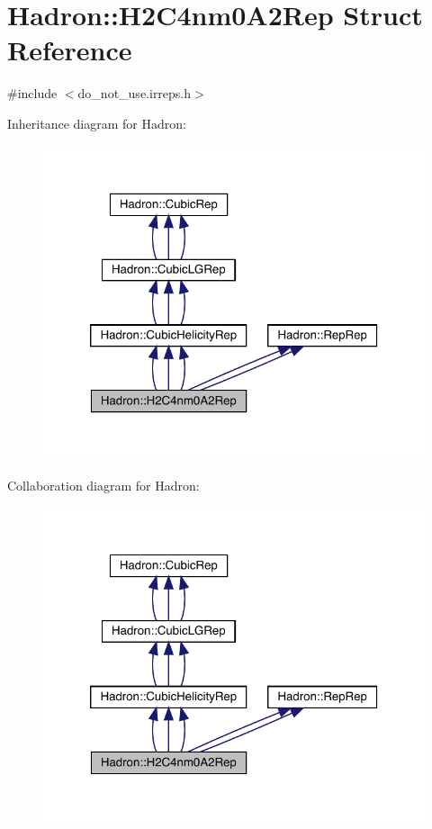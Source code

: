 \hypertarget{structHadron_1_1H2C4nm0A2Rep}{}\section{Hadron\+:\+:H2\+C4nm0\+A2\+Rep Struct Reference}
\label{structHadron_1_1H2C4nm0A2Rep}


{\ttfamily \#include $<$do\+\_\+not\+\_\+use.\+irreps.\+h$>$}



Inheritance diagram for Hadron\+:
\nopagebreak
\begin{figure}[H]
\begin{center}
\leavevmode
\includegraphics[width=320pt]{da/da3/structHadron_1_1H2C4nm0A2Rep__inherit__graph}
\end{center}
\end{figure}


Collaboration diagram for Hadron\+:
\nopagebreak
\begin{figure}[H]
\begin{center}
\leavevmode
\includegraphics[width=320pt]{df/dc6/structHadron_1_1H2C4nm0A2Rep__coll__graph}
\end{center}
\end{figure}
